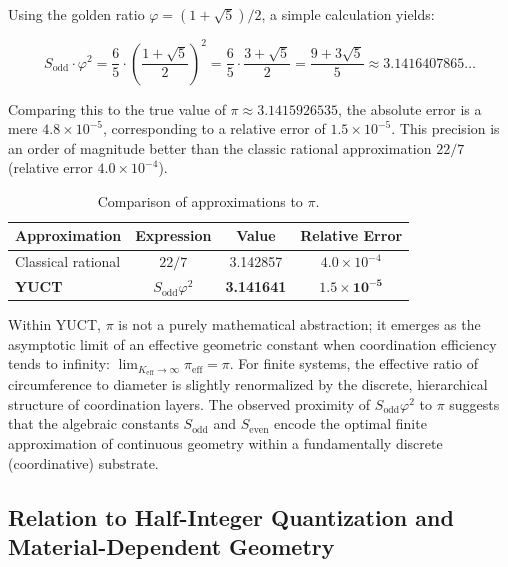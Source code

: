 \documentclass[12pt,a4paper]{article}
\begin{document}
	Using the golden ratio \(\varphi = (1+\sqrt{5})/2\), a simple calculation yields:

	\begin{equation}
	S_{\mathrm{odd}} \cdot \varphi^2 = \frac{6}{5} \cdot \left(\frac{1+\sqrt{5}}{2}\right)^2 
	= \frac{6}{5} \cdot \frac{3+\sqrt{5}}{2} 
	= \frac{9 + 3\sqrt{5}}{5} \approx 3.1416407865\dots
	\end{equation}

	Comparing this to the true value of \(\pi \approx 3.1415926535\), the absolute error is a mere \(4.8 \times 10^{-5}\), corresponding to a relative error of \(1.5 \times 10^{-5}\). This precision is 	an order of magnitude better than the classic rational approximation \(22/7\) (relative error \(4.0 \times 10^{-4}\)).

	\begin{table}[htbp]
	\centering
	\caption{Comparison of approximations to \(\pi\).}
	\label{tab:pi_approx}
	\begin{tabular}{lccc}
		\toprule
		\textbf{Approximation} & \textbf{Expression} & \textbf{Value} & \textbf{Relative Error} \\
		\midrule
		Classical rational & \(22/7\) & 3.142857 & \(4.0 \times 10^{-4}\) \\
		\textbf{YUCT} & \(S_{\mathrm{odd}}\varphi^2\) & \textbf{3.141641} & \(\mathbf{1.5 \times 10^{-5}}\) \\
		\bottomrule
	\end{tabular}
	\end{table}

	Within YUCT, \(\pi\) is not a purely mathematical abstraction; it emerges as the asymptotic limit of an effective geometric constant when coordination efficiency tends to infinity: \(\lim_{K_{\mathrm{eff}} \to \infty} \pi_{\mathrm{eff}} = \pi\). For finite systems, the effective ratio of circumference to diameter is slightly renormalized by the discrete, hierarchical structure of coordination layers. The observed proximity of \(S_{\mathrm{odd}}\varphi^2\) to \(\pi\) suggests that the algebraic constants \(S_{\mathrm{odd}}\) and \(S_{\mathrm{even}}\) encode the optimal finite approximation of continuous geometry within a fundamentally discrete (coordinative) substrate.

\subsection{Relation to Half-Integer Quantization and Material-Dependent Geometry}
\end{document}
